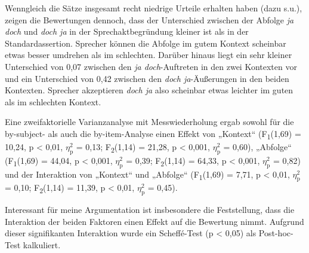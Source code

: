 Wenngleich die Sätze insgesamt recht niedrige Urteile erhalten haben (dazu s.u.), zeigen die Bewertungen dennoch, dass der Unterschied zwischen der Abfolge \textit{ja doch} und \textit{doch ja} in der Sprechaktbegründung  kleiner ist als in der  Standardassertion. Sprecher können die Abfolge im gutem Kontext scheinbar etwas besser umdrehen als im schlechten. Darüber hinaus liegt ein sehr kleiner Unterschied von 0,07 zwischen den \textit{ja doch}-Auftreten in den zwei Kontexten vor und ein Unterschied von 0,42 zwischen den \textit{doch ja}-Äußerungen in den beiden Kontexten. Sprecher akzeptieren \textit{doch ja} also scheinbar etwas leichter im guten als im schlechten Kontext.

Eine zweifaktorielle Varianzanalyse mit Messwiederholung ergab sowohl für die by-subject- als auch die by-item-Analyse einen Effekt von „Kontext“ (F\textsubscript{1}(1,69) = 10,24, p < 0,01, $\eta_{\textrm{p}}^{2}$ = 0,13; F\textsubscript{2}(1,14) = 21,28, p < 0,001, $\eta_{\textrm{p}}^{2}$ = 0,60), „Abfolge“ (F\textsubscript{1}(1,69) = 44,04, p < 0,001, $\eta_{\textrm{p}}^{2}$ = 0,39; F\textsubscript{2}(1,14) = 64,33, p < 0,001, $\eta_{\textrm{p}}^{2}$ = 0,82) und der Interaktion von „Kontext“ und „Abfolge“ (F\textsubscript{1}(1,69) = 7,71, p < 0,01, $\eta_{\textrm{p}}^{2}$ = 0,10; F\textsubscript{2}(1,14) = 11,39, p < 0,01, 
$\eta_{\textrm{p}}^{2}$ = 0,45).

Interessant für meine Argumentation ist insbesondere die Feststellung, dass die Interaktion der beiden Faktoren einen Effekt auf die Bewertung nimmt. Aufgrund dieser signifikanten Interaktion wurde ein Scheff\'{e}-Test (p < 0,05) als Post-hoc-Test kalkuliert. 

